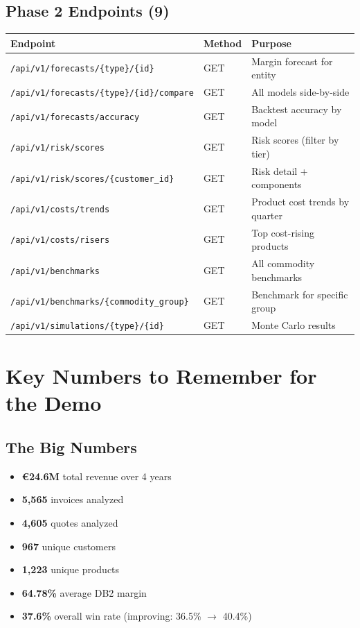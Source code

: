 \documentclass[11pt,a4paper]{article}
\newcommand{\EUR}{\euro{}}
\newcommand{\code}[1]{\texttt{#1}}
\begin{document}
\subsection{Phase 2 Endpoints (9)}

\begin{longtable}{l l p{5.5cm}}
\toprule
\textbf{Endpoint} & \textbf{Method} & \textbf{Purpose} \\
\midrule
\endfirsthead
\code{/api/v1/forecasts/\{type\}/\{id\}}          & GET & Margin forecast for entity \\
\code{/api/v1/forecasts/\{type\}/\{id\}/compare}   & GET & All models side-by-side \\
\code{/api/v1/forecasts/accuracy}                   & GET & Backtest accuracy by model \\
\code{/api/v1/risk/scores}                          & GET & Risk scores (filter by tier) \\
\code{/api/v1/risk/scores/\{customer\_id\}}         & GET & Risk detail + components \\
\code{/api/v1/costs/trends}                         & GET & Product cost trends by quarter \\
\code{/api/v1/costs/risers}                         & GET & Top cost-rising products \\
\code{/api/v1/benchmarks}                           & GET & All commodity benchmarks \\
\code{/api/v1/benchmarks/\{commodity\_group\}}      & GET & Benchmark for specific group \\
\code{/api/v1/simulations/\{type\}/\{id\}}         & GET & Monte Carlo results \\
\bottomrule
\end{longtable}

\section{Key Numbers to Remember for the Demo}

\subsection{The Big Numbers}

\begin{itemize}[nosep]
  \item \textbf{\EUR24.6M} total revenue over 4 years
  \item \textbf{5{,}565} invoices analyzed
  \item \textbf{4{,}605} quotes analyzed
  \item \textbf{967} unique customers
  \item \textbf{1{,}223} unique products
  \item \textbf{64.78\%} average DB2 margin
  \item \textbf{37.6\%} overall win rate (improving: 36.5\% $\to$ 40.4\%)
\end{itemize}
\end{document}
